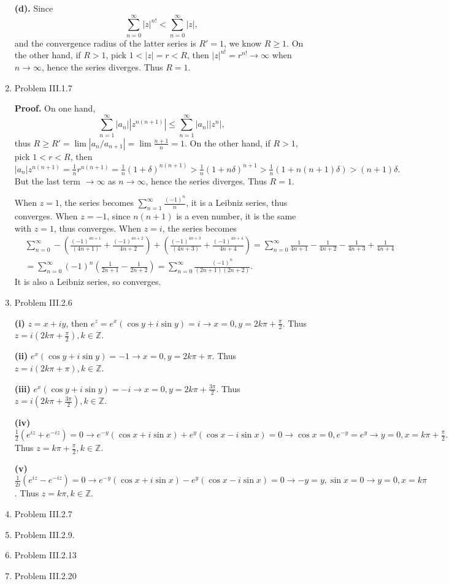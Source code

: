 \documentclass{article}%
\begin{document}
\begin{enumerate}
\textbf{(d).} Since 
$$
\sum_{n=0}^{\infty}|z|^{n!} < \sum_{n=0}^{\infty}|z|,
$$
and the convergence radius of the latter series is $R' = 1$, we know $R\ge 1$. On the other hand, if $R > 1$, pick $1 < |z| = r < R$, then $|z|^{n!} = r^{n!}\to\infty $ when $n\to\infty$, hence the series diverges. Thus $R = 1$.

\item Problem III.1.7

\textbf{Proof.} On one hand, 
$$
\sum_{n=1}^{\infty} |a_n| |z^{n(n+1)}| \le \sum_{n=1}^{\infty}|a_n||z^n|,
$$
thus $R \ge R' = \lim|a_n/a_{n+1}| = \lim \frac{n+1}{n} = 1 $. On the other hand, if $R > 1$, pick $1 < r < R$, then $|a_n|z^{n(n+1)} = \frac{1}{n}r^{n(n+1)} = \frac{1}{n}(1+\delta)^{n(n+1)} > \frac{1}{n} (1+n\delta)^{n+1} > \frac{1}{n}(1+n(n+1)\delta) > (n+1)\delta. $ But the last term $\to\infty$ as $n\to\infty$, hence the series diverges. Thus $R = 1$.

When $z = 1$, the series becomes $\sum_{n=1}^{\infty}\frac{(-1)^n}{n}$, it is a Leibniz series, thus converges. When $z = -1$, since $n(n+1)$ is a even number, it is the same with $z = 1$, thus converges. When $z = i$, the series becomes
$$
\begin{aligned}
&\sum_{n=0}^{\infty} -\left(\frac{(-1)^{4n+1}}{(4n+1)}+\frac{(-1)^{4n+2}}{4n+2}\right)+\left(\frac{(-1)^{4n+3}}{(4n+3)}+\frac{(-1)^{4n+4}}{4n+4}\right) = \sum_{n=0}^{\infty}\frac{1}{4n+1}-\frac{1}{4n+2}-\frac{1}{4n+3}+\frac{1}{4n+4} \\
&= \sum_{n=0}^{\infty}(-1)^n (\frac{1}{2n+1}-\frac{1}{2n+2}) = \sum_{n=0}^{\infty}\frac{(-1)^n}{(2n+1)(2n+2)}.
\end{aligned}
$$
It is also a Leibniz series, so converges.


\item Problem III.2.6

\textbf{(i)} $z = x+iy$, then $e^z = e^x(\cos y+i\sin y) = i \to x = 0, y = 2k\pi + \frac{\pi}{2}$. Thus $z = i(2k\pi+\frac{\pi}{2}), k \in \mathbb{Z}$.

\textbf{(ii)} $e^x(\cos y+i\sin y) = -1 \to x = 0, y = 2k\pi+\pi $. Thus $z = i(2k\pi+\pi), k \in \mathbb{Z}$.

\textbf{(iii)} $e^x(\cos y+i\sin y) = -i \to x = 0, y = 2k\pi + \frac{3\pi}{2}$. Thus $z = i(2k\pi+\frac{3\pi}{2}), k \in \mathbb{Z}$.

\textbf{(iv)} $\frac{1}{2}(e^{iz}+e^{-iz}) = 0 \to e^{-y}(\cos x+i\sin x)+e^y(\cos x-i\sin x) = 0 \to \cos x = 0, e^{-y} = e^y \to y = 0, x = k\pi+\frac{\pi}{2}. $ Thus $z = k\pi+\frac{\pi}{2}, k\in\mathbb{Z} $.

\textbf{(v)} $\frac{1}{2i}(e^{iz}-e^{-iz}) = 0 \to e^{-y}(\cos x+i\sin x)-e^y(\cos x-i\sin x) = 0 \to -y = y, \sin x = 0 \to y = 0, x = k\pi $. Thus $z = k\pi, k\in\mathbb{Z}$.

\item Problem III.2.7

\item Problem III.2.9.

\item Problem III.2.13

\item Problem III.2.20

\end{enumerate}
\end{document}

